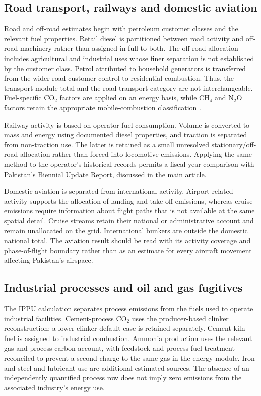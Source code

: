 \documentclass[essd]{copernicus}
\begin{document}
\subsection{Road transport, railways and domestic aviation}
\label{sec:transport_methods}

Road and off-road estimates begin with petroleum customer classes and the relevant fuel properties. Retail diesel is partitioned between road activity and off-road machinery rather than assigned in full to both. The off-road allocation includes agricultural and industrial uses whose finer separation is not established by the customer class. Petrol attributed to household generators is transferred from the wider road-customer control to residential combustion. Thus, the transport-module total and the road-transport category are not interchangeable. Fuel-specific CO$_2$ factors are applied on an energy basis, while CH$_4$ and N$_2$O factors retain the appropriate mobile-combustion classification \citep{IPCC2006}.

Railway activity is based on operator fuel consumption. Volume is converted to mass and energy using documented diesel properties, and traction is separated from non-traction use. The latter is retained as a small unresolved stationary/off-road allocation rather than forced into locomotive emissions. Applying the same method to the operator's historical records permits a fiscal-year comparison with Pakistan's Biennial Update Report, discussed in the main article.

Domestic aviation is separated from international activity. Airport-related activity supports the allocation of landing and take-off emissions, whereas cruise emissions require information about flight paths that is not available at the same spatial detail. Cruise streams retain their national or administrative account and remain unallocated on the grid. International bunkers are outside the domestic national total. The aviation result should be read with its activity coverage and phase-of-flight boundary rather than as an estimate for every aircraft movement affecting Pakistan's airspace.

\subsection{Industrial processes and oil and gas fugitives}
\label{sec:process_methods}

The IPPU calculation separates process emissions from the fuels used to operate industrial facilities. Cement-process CO$_2$ uses the producer-based clinker reconstruction; a lower-clinker default case is retained separately. Cement kiln fuel is assigned to industrial combustion. Ammonia production uses the relevant gas and process-carbon account, with feedstock and process-fuel treatment reconciled to prevent a second charge to the same gas in the energy module. Iron and steel and lubricant use are additional estimated sources. The absence of an independently quantified process row does not imply zero emissions from the associated industry's energy use.
\end{document}
